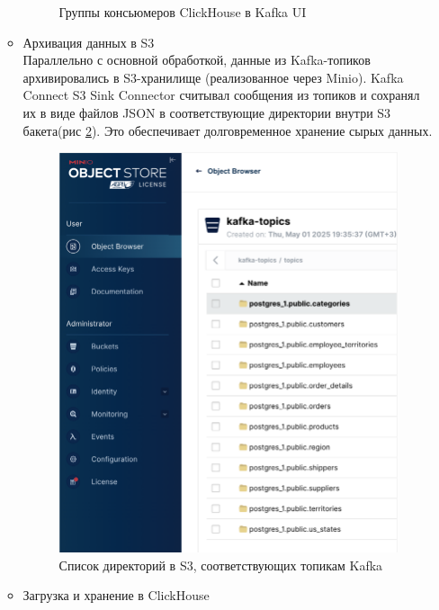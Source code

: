 \begin{enumerate}[1.]
\begin{itemize}
\begin{figure}
                  \caption{Группы консьюмеров ClickHouse в Kafka UI}
                  \label{fig:ex1_kafka_ch_consumer}
                \end{figure}
                \FloatBarrier
          \item Архивация данных в S3\\
                Параллельно с основной обработкой, данные из Kafka-топиков архивировались
                в S3-хранилище (реализованное через Minio). Kafka Connect S3 Sink Connector считывал сообщения
                из топиков и сохранял их в виде файлов JSON в соответствующие директории внутри S3 бакета(рис \ref{fig:ex1_s3}). Это обеспечивает долговременное хранение сырых данных.
                \begin{figure}
                  \center
                  \includegraphics [scale=0.45] {my_folder/images/ex1_s3}
                  \caption{ Список директорий в S3, соответствующих топикам Kafka}
                  \label{fig:ex1_s3}
                \end{figure}
                \FloatBarrier
          \item Загрузка и хранение в ClickHouse\\

\end{itemize}
\end{enumerate}
